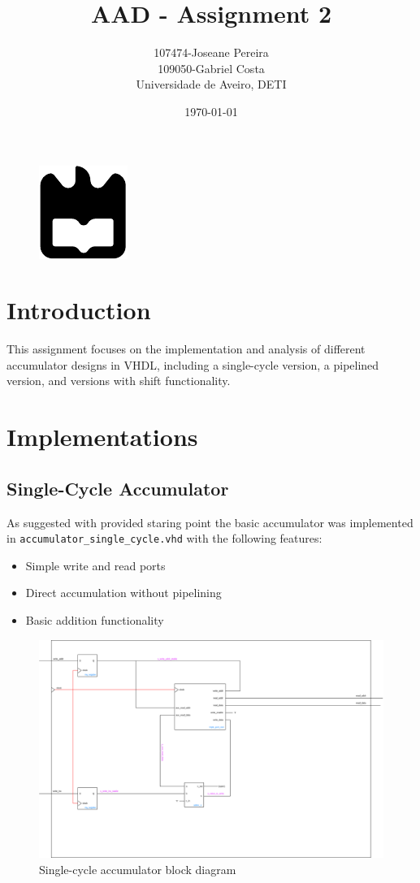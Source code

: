 \documentclass[a4paper,12pt]{article}
\title{AAD - Assignment 2}
\author{107474-Joseane Pereira \\
109050-Gabriel Costa \\
Universidade de Aveiro, DETI}
\date{\today}
\begin{document}
\begin{figure}
    \centering
    \includegraphics[width=0.3\linewidth]{ua.pdf}
    \label{fig:enter-label}
\end{figure}
\maketitle
\newpage
\tableofcontents
\newpage
\section{Introduction}
This assignment focuses on the implementation and analysis of different 
accumulator designs in VHDL, including a single-cycle version, a pipelined 
version, and versions with shift functionality.


\section{Implementations}
\subsection{Single-Cycle Accumulator}
As suggested with provided staring point the basic accumulator was implemented in
\texttt{accumulator\_single\_cycle.vhd} with the following features:
\begin{itemize}
    \item Simple write and read ports
    \item Direct accumulation without pipelining
    \item Basic addition functionality
\end{itemize}
\begin{figure}[H]
    \centering
    \includegraphics[width=1.0\linewidth]{accumulator_single_sycle.png}
    \caption{Single-cycle accumulator block diagram}
    \label{fig:single_cycle}
\end{figure}
\end{document}
